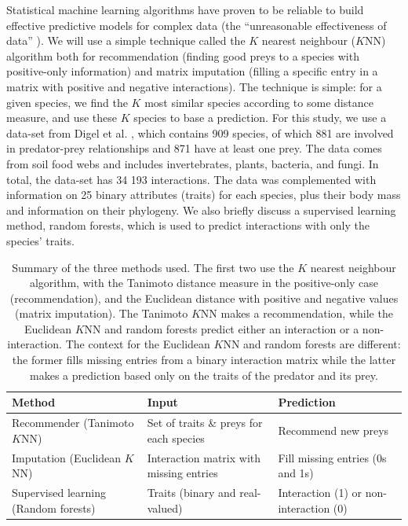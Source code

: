 \documentclass[letterpaper]{article}
\begin{document}
Statistical machine learning algorithms \cite{mur12} have proven to be reliable
to build effective predictive models for complex data (the ``unreasonable
effectiveness of data'' \cite{hal09}). We will use a simple technique called
the $K$ nearest neighbour ($K$NN) algorithm both for recommendation (finding
good preys to a species with positive-only information) and matrix imputation
(filling a specific entry in a matrix with positive and negative interactions).
The technique is simple: for a given species, we find the $K$ most similar
species according to some distance measure, and use these $K$ species to base a
prediction. For this study, we use a data-set from Digel et al. \cite{dig14},
which contains 909 species, of which 881 are involved in predator-prey
relationships and 871 have at least one prey. The data comes from soil food
webs and includes invertebrates, plants, bacteria, and fungi. In total, the
data-set has 34 193 interactions. The data was complemented with information on
25 binary attributes (traits) for each species, plus their body mass and
information on their phylogeny. We also briefly discuss a supervised learning
method, random forests, which is used to predict interactions with only the
species' traits.

\begin{table}
  \centering
  \begin{tabular}{|lll|}
    \hline
    Method                                 & Input                                    & Prediction \\
    \hline
    \hline
    Recommender (Tanimoto $K$NN)           & Set of traits \& preys for each species  & Recommend new preys\\
    Imputation (Euclidean $K$NN)           & Interaction matrix with missing entries  & Fill missing entries (0s and 1s)\\
    Supervised learning (Random forests)   & Traits (binary and real-valued)          & Interaction (1) or non-interaction (0)\\
    \hline
  \end{tabular}

  \caption{Summary of the three methods used. The first two use the $K$ nearest
  neighbour algorithm, with the Tanimoto distance measure in the positive-only
  case (recommendation), and the Euclidean distance with positive and negative
  values (matrix imputation). The Tanimoto $K$NN makes a recommendation, while
  the Euclidean $K$NN and random forests predict either an interaction or
  a non-interaction. The context for the Euclidean $K$NN and random forests are
  different: the former fills missing entries from a binary interaction matrix
  while the latter makes a prediction based only on the traits of the predator
  and its prey.}

  \label{table:methods_summary}
\end{table}
\end{document}
